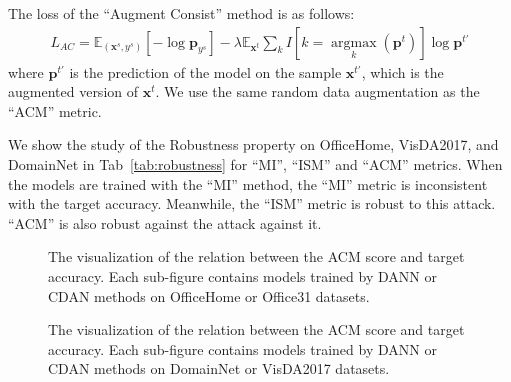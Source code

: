 The loss of the ``Augment Consist'' method is as follows:
\begin{align}
 L_{AC} = \mathbb{E}_{(\boldsymbol{x}^s,y^s)}[-\log \boldsymbol{p}_{y^s}]- \lambda \mathbb{E}_{\boldsymbol{x}^t} \sum_k I[k=\underset{k}{\operatorname{argmax}}(\boldsymbol{p}^t)] \log \boldsymbol{p}^{t \prime} \nonumber
\end{align}
where $\boldsymbol{p}^{t \prime}$ is the prediction of the model on the sample $\boldsymbol{x}^{t \prime}$, which is the augmented version of $\boldsymbol{x}^t$. We use the same random data augmentation as the ``ACM'' metric.

We show the study of the Robustness property on OfficeHome, VisDA2017, and DomainNet in Tab~\ref{tab:robustness} for ``MI'', ``ISM'' and ``ACM'' metrics. When the models are trained with the ``MI'' method, the ``MI'' metric is inconsistent with the target accuracy. Meanwhile, the ``ISM'' metric is robust to this attack. ``ACM'' is also robust against the attack against it.

\begin{figure}[t]
    \centering
    \caption{The visualization of the relation between the ACM score and target accuracy. Each sub-figure contains models trained by DANN or CDAN methods on OfficeHome or Office31 datasets.}
    \label{fig:visual_1}
\vspace{-2mm}
\end{figure}

\begin{figure}[t]
    \centering
    \caption{The visualization of the relation between the ACM score and target accuracy. Each sub-figure contains models trained by DANN or CDAN methods on DomainNet or VisDA2017 datasets.}
    \label{fig:visual_2}
\vspace{-2mm}
\end{figure}

